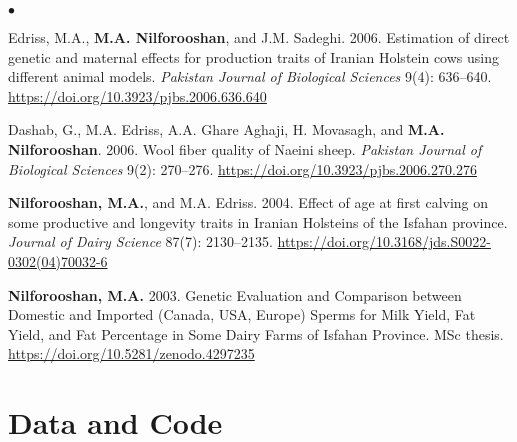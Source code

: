\documentclass[margin,line]{res}
\newenvironment{list2}{
  \begin{list}{$\bullet$}{%
      \setlength{\itemsep}{0in}
      \setlength{\parsep}{0in} \setlength{\parskip}{0in}
      \setlength{\topsep}{0in} \setlength{\partopsep}{0in}
      \setlength{\leftmargin}{0.2in}}}{\end{list}}
\begin{document}
\begin{resume}
\begin{list2}
    \item Edriss, M.A., {\bf M.A. Nilforooshan}, and J.M. Sadeghi. 2006. Estimation of direct genetic and maternal effects for production traits of Iranian Holstein cows using different animal models. {\em Pakistan Journal of Biological Sciences} 9(4): 636--640. \url{https://doi.org/10.3923/pjbs.2006.636.640}
    \item Dashab, G., M.A. Edriss, A.A. Ghare Aghaji, H. Movasagh, and {\bf M.A. Nilforooshan}. 2006. Wool fiber quality of Naeini sheep. {\em Pakistan Journal of Biological Sciences} 9(2): 270--276. \url{https://doi.org/10.3923/pjbs.2006.270.276}
    \item {\bf Nilforooshan, M.A.}, and M.A. Edriss. 2004. Effect of age at first calving on some productive and longevity traits in Iranian Holsteins of the Isfahan province. {\em Journal of Dairy Science} 87(7): 2130--2135. \url{https://doi.org/10.3168/jds.S0022-0302(04)70032-6}
    \item {\bf Nilforooshan, M.A.} 2003. Genetic Evaluation and Comparison between Domestic and Imported (Canada, USA, Europe) Sperms for Milk Yield, Fat Yield, and Fat Percentage in Some Dairy Farms of Isfahan Province. MSc thesis. \url{https://doi.org/10.5281/zenodo.4297235}
  \end{list2}
  \section{\sc Data and Code}


\end{resume}
\end{document}
